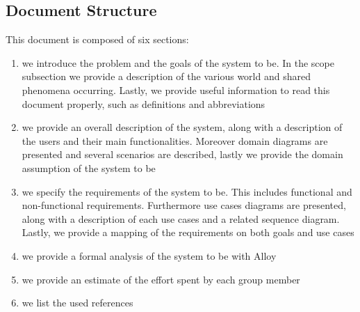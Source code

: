 \subsection{Document Structure}
This document is composed of six sections:
\begin{enumerate}
    \item  we introduce the problem and the goals of the system to be. In the scope subsection
          we provide a description of the various world and shared phenomena occurring. Lastly, we provide useful information to read this document properly, such as definitions and abbreviations
    \item  we provide an overall description of the system, along with a description of the users and their main functionalities. Moreover domain diagrams are presented and several scenarios are described, lastly we provide the domain assumption of the system to be
    \item  we specify the requirements of the system to be. This includes functional and non-functional requirements. Furthermore use cases diagrams are presented, along with a description of each use cases and a related sequence diagram. Lastly, we provide a mapping of the requirements on both goals and use cases
    \item  we provide a formal analysis of the system to be with Alloy
    \item  we provide an estimate of the effort spent by each group member
    \item  we list the used references
\end{enumerate}